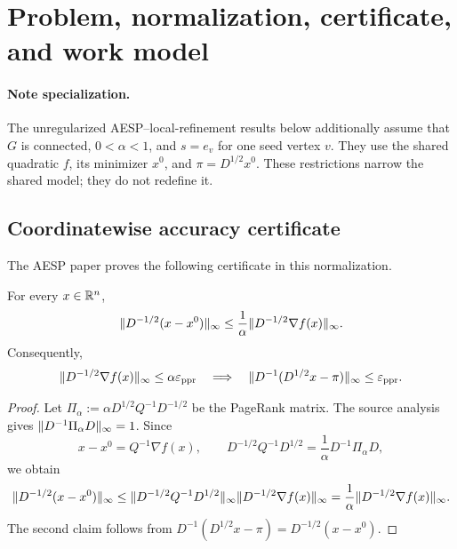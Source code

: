 \section{Problem, normalization, certificate, and work model}
\label{sec:problem}



\paragraph{Note specialization.}
The unregularized AESP--local-refinement results below additionally assume
that \(G\) is connected, \(0<\alpha<1\), and \(s=e_v\) for one seed vertex
\(v\).  They use the shared quadratic \(f\), its minimizer \(x^0\), and
\(\pi=D^{1/2}x^0\).  These restrictions narrow the shared model; they do not
redefine it.

\subsection{Coordinatewise accuracy certificate}

The AESP paper proves the following certificate in this normalization.

\begin{lemma}
\label{lem:certificate}
For every $x\in\mathbb{R}^n$,
\begin{equation}
  \lVert D^{-1/2}(x-x^0)\rVert_\infty
  \leq
  \frac1\alpha\lVert D^{-1/2}\nabla f(x)\rVert_\infty.
  \label{eq:certificate}
\end{equation}
Consequently,
\begin{equation}
  \lVert D^{-1/2}\nabla f(x)\rVert_\infty\leq\alpha\varepsilon_{\mathrm{ppr}}
  \quad\Longrightarrow\quad
  \lVert D^{-1}(D^{1/2}x-\pi)\rVert_\infty\leq\varepsilon_{\mathrm{ppr}}.
  \label{eq:certificate-stop}
\end{equation}
\end{lemma}

\begin{proof}
Let
$\Pi_\alpha:=\alpha D^{1/2}Q^{-1}D^{-1/2}$ be the PageRank matrix.  The source
analysis gives $\lVert D^{-1}\Pi_\alpha D\rVert_\infty=1$.  Since
\[
  x-x^0=Q^{-1}\nabla f(x),
  \qquad
  D^{-1/2}Q^{-1}D^{1/2}
  =\frac1\alpha D^{-1}\Pi_\alpha D,
\]
we obtain
\[
  \lVert D^{-1/2}(x-x^0)\rVert_\infty
  \leq
  \lVert D^{-1/2}Q^{-1}D^{1/2}\rVert_\infty
  \lVert D^{-1/2}\nabla f(x)\rVert_\infty
  =\frac1\alpha\lVert D^{-1/2}\nabla f(x)\rVert_\infty.
\]
The second claim follows from $D^{-1}(D^{1/2}x-\pi)=D^{-1/2}(x-x^0)$.
\end{proof}

